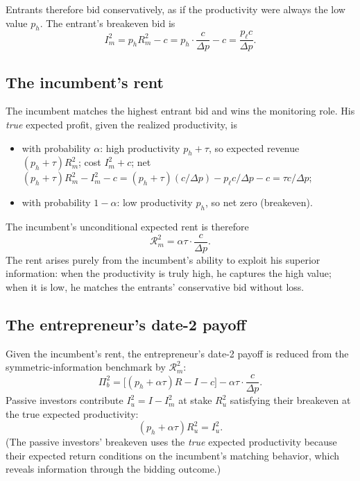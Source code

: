 \documentclass[11pt,a4paper,oneside]{book}
\theoremstyle{plain}
\theoremstyle{definition}
\theoremstyle{remark}
\numberwithin{equation}{chapter}
\begin{document}
Entrants therefore bid conservatively, as if the productivity were always the low value $p_h$.
The entrant's breakeven bid is
\begin{equation}\label{eq:mon-entrant-bid}
  I_m^2 = p_h R_m^2 - c = p_h \cdot \frac{c}{\Delta p} - c = \frac{p_\ell c}{\Delta p}.
\end{equation}

\subsection{The incumbent's rent}

The incumbent matches the highest entrant bid and wins the monitoring role.
His \emph{true} expected profit, given the realized productivity, is
\begin{itemize}
  \item with probability $\alpha$: high productivity $p_h + \tau$, so expected revenue $(p_h + \tau) R_m^2$; cost $I_m^2 + c$; net $(p_h + \tau) R_m^2 - I_m^2 - c = (p_h + \tau) (c/\Delta p) - p_\ell c/\Delta p - c = \tau c/\Delta p$;
  \item with probability $1 - \alpha$: low productivity $p_h$, so net zero (breakeven).
\end{itemize}
The incumbent's unconditional expected rent is therefore
\begin{equation}\label{eq:mon-incumbent-rent}
  \mathcal{R}_m^2 = \alpha \tau \cdot \frac{c}{\Delta p}.
\end{equation}
The rent arises purely from the incumbent's ability to exploit his superior information: when the productivity is truly high, he captures the high value; when it is low, he matches the entrants' conservative bid without loss.

\subsection{The entrepreneur's date-2 payoff}

Given the incumbent's rent, the entrepreneur's date-2 payoff is reduced from the symmetric-information benchmark by $\mathcal{R}_m^2$:
\begin{equation}\label{eq:mon-ent-date2}
  \Pi_b^2 = \bigl[(p_h + \alpha \tau) R - I - c\bigr] - \alpha \tau \cdot \frac{c}{\Delta p}.
\end{equation}
Passive investors contribute $I_u^2 = I - I_m^2$ at stake $R_u^2$ satisfying their breakeven at the true expected productivity:
\begin{equation*}
  (p_h + \alpha \tau) R_u^2 = I_u^2.
\end{equation*}
(The passive investors' breakeven uses the \emph{true} expected productivity because their expected return conditions on the incumbent's matching behavior, which reveals information through the bidding outcome.)
\end{document}

